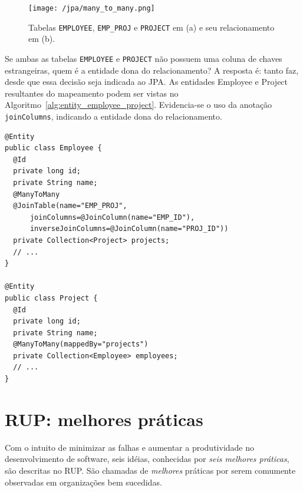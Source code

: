 \documentclass[
  10.5pt,				  %
	openright,			%
	twoside,			  %
  a5paper,
  chapter=TITLE,	%
	section=TITLE,	%
  hyphens,        %
	english,        %
	brazil          %
]{abntex2}
\begin{document}
\begin{figure}[!ht]
  \caption{\label{fig:jpa_manytomany} Tabelas \texttt{EMPLOYEE},  \texttt{EMP\_PROJ} e \texttt{PROJECT} em (a) e seu relacionamento em (b).}
  \begin{center}
    \texttt{[image: /jpa/many\_to\_many.png]}
  \end{center}
\end{figure}

Se ambas as tabelas \texttt{EMPLOYEE} e \texttt{PROJECT} não possuem uma coluna de chaves estrangeiras, quem é a entidade dona do relacionamento? A resposta é: tanto faz, desde que essa decisão seja indicada ao JPA. As entidades Employee e Project resultantes do mapeamento podem ser vistas no Algoritmo~\ref{alg:entity_employee_project}. Evidencia-se o uso da anotação \texttt{joinColumns}, indicando a entidade dona do relacionamento.


\begin{lstlisting}[caption={Classes Employee e Project.}, label={alg:entity_employee_project}]
@Entity
public class Employee {
  @Id
  private long id;
  private String name;
  @ManyToMany
  @JoinTable(name="EMP_PROJ",
      joinColumns=@JoinColumn(name="EMP_ID"),
      inverseJoinColumns=@JoinColumn(name="PROJ_ID"))
  private Collection<Project> projects;
  // ...
}

@Entity
public class Project {
  @Id
  private long id;
  private String name;
  @ManyToMany(mappedBy="projects")
  private Collection<Employee> employees;
  // ...
}
\end{lstlisting}
%



\chapter{RUP: melhores práticas}\label{anexo:rup}

Com o intuito de minimizar as falhas e aumentar a produtividade no desenvolvimento de software, seis idéias, conhecidas por \emph{seis melhores práticas}, são descritas no RUP. São chamadas de \emph{melhores} práticas por serem comumente observadas em organizações bem sucedidas.
\end{document}
